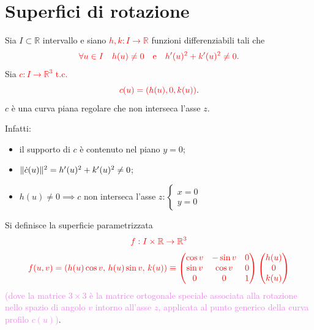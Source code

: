     \section{Superfici di rotazione}

        Sia $I \subset \mathbb{R}$ intervallo e siano \textcolor{red}{$h, k : I \to \mathbb{R}$} funzioni differenziabili tali che 
        \[
         \color{red} \forall u \in I \quad h(u) \neq 0 \quad \text{e} \quad h'(u)^2 + k'(u)^2 \neq 0.
        \]
        Sia \textcolor{red}{$c : I \to \mathbb{R}^3$} \textcolor{red}{t.c.}
        \[
        \textcolor{red}{c(u) = (h(u), 0, k(u))}.
        \]
        $c$ è una curva piana regolare che non interseca l'asse $z$. 

        Infatti:
        \begin{itemize} \color{verde}
            \item il supporto di $c$ è contenuto nel piano $y = 0$;
            \item $\lVert\dot{c}(u)\rVert^2 = h'(u)^2 + k'(u)^2 \neq 0$;
            \item $h(u) \neq 0 \implies c$ non interseca l'asse $z : \begin{cases} x = 0 \\ y = 0 \end{cases}$ 
        \end{itemize}
        Si definisce la superficie parametrizzata
        \[
        \textcolor{red}{f : I \times \mathbb{R} \to \mathbb{R}^3}
        \]
        \[
        \color{red} f(u,v) = (h(u)\cos v, \, h(u)\sin v, \, k(u)) \\
        \equiv \begin{pmatrix} \cos v & -\sin v & 0 \\ \sin v & \cos v & 0 \\ 0 & 0 & 1 \end{pmatrix} \begin{pmatrix} h(u) \\ 0 \\ k(u) \end{pmatrix}
        \]
        \textcolor{violet}{(dove la matrice $3 \times 3$ è la matrice ortogonale speciale associata alla rotazione nello spazio di angolo $v$ intorno all'asse $z$, applicata al punto generico della curva profilo $c(u)$)}.

